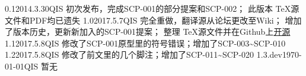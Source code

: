 


\begin{versionhistory}
	\vhEntry
	{0.1}{2014.3.30}{QIS}{
		初次发布，完成SCP-001的部分提案和SCP-002；
		此版本 \TeX 源文件和PDF均已遗失
	}
	\vhEntry
	{1.0}{2017.5.7}{QIS}{
		完全重做，翻译源从论坛更改至Wiki；
		增加了版本历史，更新新加入的SCP-001提案；
		整理 \TeX 源文件并在Github上\href{https://github.com/7sDream/scp-pdf}{开源}
	}
	\vhEntry
	{1.1}{2017.5.8}{QIS}{
		修改了SCP-001原型里的符号错误；增加了SCP-003\textasciitilde SCP-010
	}
	\vhEntry
	{1.2}{2017.5.8}{QIS}{
		修改了前文里的几个脚注；增加了SCP-011\textasciitilde SCP-020
	}
	\vhEntry
	{1.3.dev}{\today}{QIS}{
		暂无
	}
\end{versionhistory}
